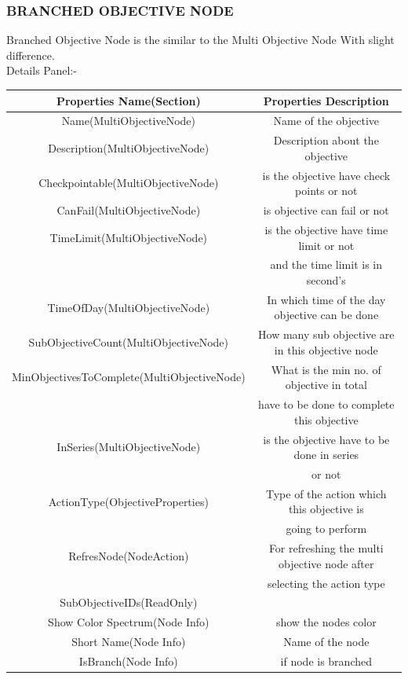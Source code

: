 \documentclass[12pt]{article}
\begin{document}
	  \subsubsection{BRANCHED OBJECTIVE NODE}
 Branched Objective Node is the similar to the Multi Objective Node With slight difference.\\
	  Details Panel:-
	  \begin{center}
	  	\begin{tabular}{|c|c|}\hline
	  	Properties Name(Section)& Properties Description\\\hline\hline
	  	Name(MultiObjectiveNode)& Name of the objective\\\hline
	  	Description(MultiObjectiveNode)& Description about the objective\\\hline
	  	Checkpointable(MultiObjectiveNode)& is the objective have check points or not\\\hline
	  	CanFail(MultiObjectiveNode)& is objective can fail or not\\\hline
	  	TimeLimit(MultiObjectiveNode)& is the objective have time limit or not\\
	  	& and the time limit is in second's	\\\hline
	  	TimeOfDay(MultiObjectiveNode)& In which time of the day objective can be done \\\hline
	  	SubObjectiveCount(MultiObjectiveNode)&How many sub objective are in this objective node\\\hline
	  	MinObjectivesToComplete(MultiObjectiveNode)&What is the min no. of objective in total\\
	  	& have to be done to complete this objective\\\hline
	  	InSeries(MultiObjectiveNode)& is the objective have to be done in series \\
	  	&or not\\\hline
	  	ActionType(ObjectiveProperties)&Type of the action which this objective is \\
	  	& going to perform\\\hline
	  	RefresNode(NodeAction)& For refreshing the multi objective node after\\
	  	& selecting the action type\\\hline
	  	SubObjectiveIDs(ReadOnly)&\\\hline
	  						Show Color Spectrum(Node Info) & show the nodes 					color\\\hline
			Short Name(Node Info) & Name of the node\\\hline
			IsBranch(Node Info) & if node is branched\\\hline
	  	
	  	\end{tabular}
	  \end{center}
\end{document}
